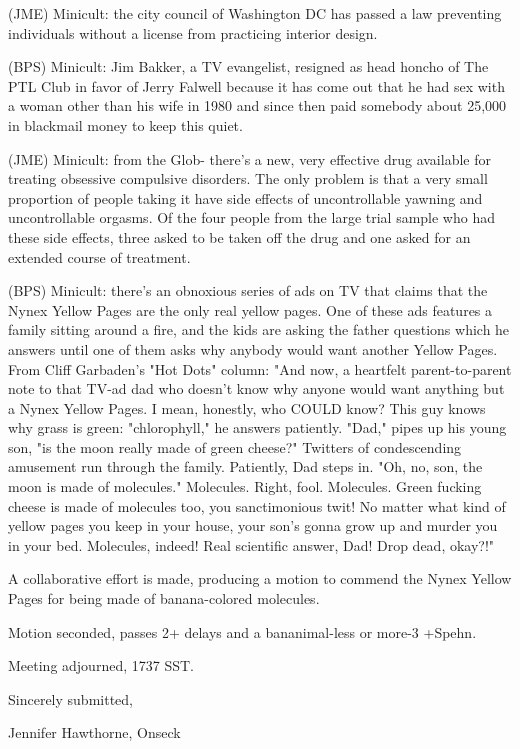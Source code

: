 \documentclass[12pt]{article}
\begin{document}
(JME) Minicult: the city council of Washington DC has passed a law preventing individuals without a license from practicing interior design.

(BPS) Minicult: Jim Bakker, a TV evangelist, resigned as head honcho of The PTL Club in favor of Jerry Falwell because it has come out that he had sex with a woman other than his wife in 1980 and since then paid somebody about 25,000 in blackmail money to keep this quiet.

(JME) Minicult: from the Glob- there's a new, very effective drug available for treating obsessive compulsive disorders. The only problem is that a very small proportion of people taking it have side effects of uncontrollable yawning and uncontrollable orgasms. Of the four people from the large trial sample who had these side effects, three asked to be taken off the drug and one asked for an extended course of treatment.

(BPS) Minicult: there's an obnoxious series of ads on TV that claims that the Nynex Yellow Pages are the only real yellow pages. One of these ads features a family sitting around a fire, and the kids are asking the father questions which he answers until one of them asks why anybody would want another Yellow Pages. From Cliff Garbaden's "Hot Dots" column: "And now, a heartfelt parent-to-parent note to that TV-ad dad who doesn't know why anyone would want anything but a Nynex Yellow Pages. I mean, honestly, who COULD know? This guy knows why grass is green: "chlorophyll," he answers patiently. "Dad," pipes up his young son, "is the moon really made of green cheese?" Twitters of condescending amusement run through the family. Patiently, Dad steps in. "Oh, no, son, the moon is made of molecules." Molecules. Right, fool. Molecules. Green fucking cheese is made of molecules too, you sanctimonious twit! No matter what kind of yellow pages you keep in your house, your son's gonna grow up and murder you in your bed. Molecules, indeed! Real scientific answer, Dad! Drop dead, okay?!"

A collaborative effort is made, producing a motion to commend the Nynex Yellow Pages for being made of banana-colored molecules.

Motion seconded, passes 2+ delays and a bananimal-less or more-3 +Spehn.

\vspace{12pt}

\noindent
Meeting adjourned, 1737 SST.

\vspace{18pt}

\centerline{Sincerely submitted,}
\centerline{Jennifer Hawthorne, Onseck}
\end{document}
